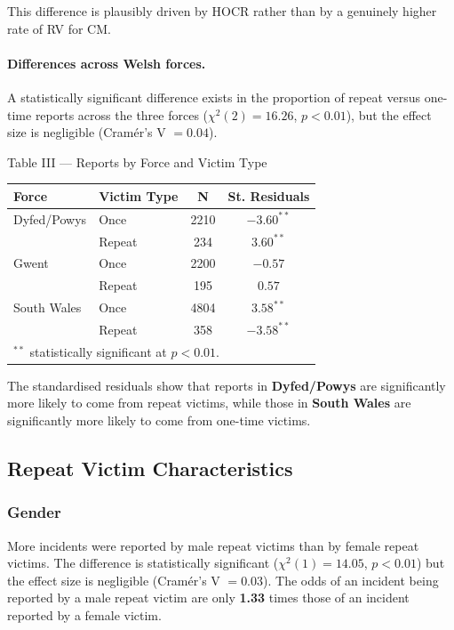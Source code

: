 \documentclass[11pt,a4paper,openany]{report}
\theoremstyle{definition}
\theoremstyle{plain}
\theoremstyle{remark}
\begin{document}
This difference is plausibly driven by HOCR rather than by a genuinely higher rate of RV for CM.

\paragraph{Differences across Welsh forces.} A statistically significant difference exists in the proportion of repeat versus one-time reports across the three forces ($\chi^2(2) = 16.26$, $p < 0.01$), but the effect size is negligible (Cramér's V $= 0.04$).

\begin{datapanel}{Table III --- Reports by Force and Victim Type}
\begin{center}
\begin{tabular}{llcc}
\toprule
\textbf{Force} & \textbf{Victim Type} & \textbf{N} & \textbf{St. Residuals} \\
\midrule
Dyfed/Powys & Once   & 2210 & $-3.60^{**}$ \\
            & Repeat & 234  & $3.60^{**}$ \\
Gwent       & Once   & 2200 & $-0.57$ \\
            & Repeat & 195  & $0.57$ \\
South Wales & Once   & 4804 & $3.58^{**}$ \\
            & Repeat & 358  & $-3.58^{**}$ \\
\bottomrule
\multicolumn{4}{l}{\footnotesize $^{**}$ statistically significant at $p < 0.01$.}
\end{tabular}
\end{center}
\end{datapanel}

The standardised residuals show that reports in \textbf{Dyfed/Powys} are significantly more likely to come from repeat victims, while those in \textbf{South Wales} are significantly more likely to come from one-time victims.

\subsection{Repeat Victim Characteristics}

\subsubsection*{Gender}

More incidents were reported by male repeat victims than by female repeat victims. The difference is statistically significant ($\chi^2(1) = 14.05$, $p < 0.01$) but the effect size is negligible (Cramér's V $= 0.03$). The odds of an incident being reported by a male repeat victim are only \textbf{1.33} times those of an incident reported by a female victim.
\end{document}
